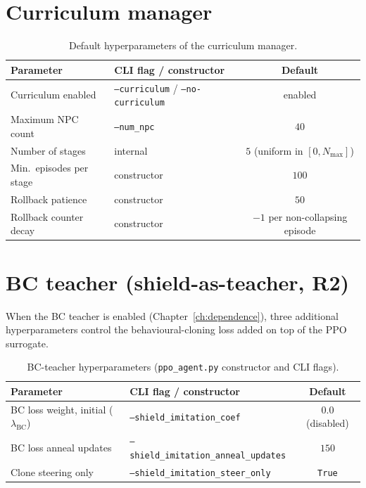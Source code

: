 \section{Curriculum manager}\label{app:hp-curriculum}

\begin{table}[H]
  \centering
  \caption{Default hyperparameters of the curriculum manager.}
  \label{tab:hp-curriculum}
  \small
  \begin{tabular}{@{}llc@{}}
    \toprule
    \textbf{Parameter} & \textbf{CLI flag / constructor} & \textbf{Default} \\
    \midrule
    Curriculum enabled       & \texttt{--curriculum} / \texttt{--no-curriculum} & enabled \\
    Maximum NPC count        & \texttt{--num\_npc}          & \(40\) \\
    Number of stages         & internal                     & \(5\) (uniform in \([0, N_{\max}]\)) \\
    Min.\ episodes per stage & constructor                  & \(100\) \\
    Rollback patience        & constructor                  & \(50\) \\
    Rollback counter decay   & constructor                  & \(-1\) per non-collapsing episode \\
    \bottomrule
  \end{tabular}
\end{table}

\section{BC teacher (shield-as-teacher, R2)}\label{app:hp-bc}

When the BC teacher is enabled (Chapter~\ref{ch:dependence}), three additional
hyperparameters control the behavioural-cloning loss added on top of the PPO
surrogate.

\begin{table}[H]
  \centering
  \caption{BC-teacher hyperparameters (\texttt{ppo\_agent.py} constructor and CLI flags).}
  \label{tab:hp-bc}
  \small
  \begin{tabular}{@{}llc@{}}
    \toprule
    \textbf{Parameter} & \textbf{CLI flag / constructor} & \textbf{Default} \\
    \midrule
    BC loss weight, initial (\(\lambda_{\mathrm{BC}}\))
      & \texttt{--shield\_imitation\_coef} & \(0.0\) (disabled) \\
    BC loss anneal updates
      & \texttt{--shield\_imitation\_anneal\_updates} & \(150\) \\
    Clone steering only
      & \texttt{--shield\_imitation\_steer\_only} & \texttt{True} \\
    \bottomrule
  \end{tabular}
\end{table}

